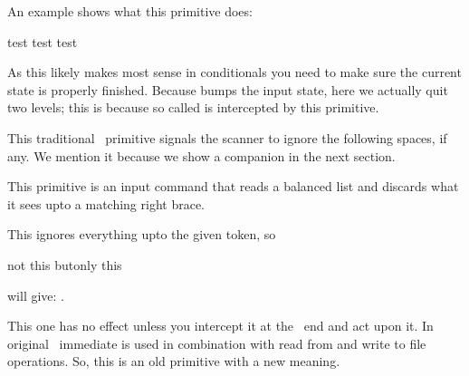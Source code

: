 \startnewprimitive[title={\prm {ignorerest}}]

An example shows what this primitive does:

\startbuffer
\tolerant\def\foo[#1]#*[#2]%
  {1234
   \ifparameter#1\or\else
     \expandafter\ignorerest
   \fi
   /#1/
   \ifparameter#2\or\else
     \expandafter\ignorerest
   \fi
   /#2/ }

\foo test \foo[456] test \foo[456][789] test
\stopbuffer

\typebuffer

As this likely makes most sense in conditionals you need to make sure the current
state is properly finished. Because  bumps the input state,
here we actually quit two levels; this is because so called  is intercepted by this primitive.

\getbuffer

\stopnewprimitive

\startoldprimitive[title={\prm {ignorespaces}}]

This traditional \TEX\ primitive signals the scanner to ignore the following
spaces, if any. We mention it because we show a companion in the next section.

\stopoldprimitive

\startnewprimitive[title={\prm {ignoretokens}}]

This primitive is an input command that reads a balanced list and discards what
it sees upto a matching right brace.

\stopnewprimitive

\startnewprimitive[title={\prm {ignoreupto}}]

This ignores everything upto the given token, so

\startbuffer
\ignoreupto \foo not this but\foo only this
\stopbuffer

\typebuffer

will give: \inlinebuffer .

\stopnewprimitive

\startoldprimitive[title={\prm {immediate}}]

This one has no effect unless you intercept it at the \LUA\ end and act upon it.
In original \TEX\ immediate is used in combination with read from and write to
file operations. So, this is an old primitive with a new meaning.

\stopoldprimitive

\startnewprimitive[title={\prm {immutable}}]

